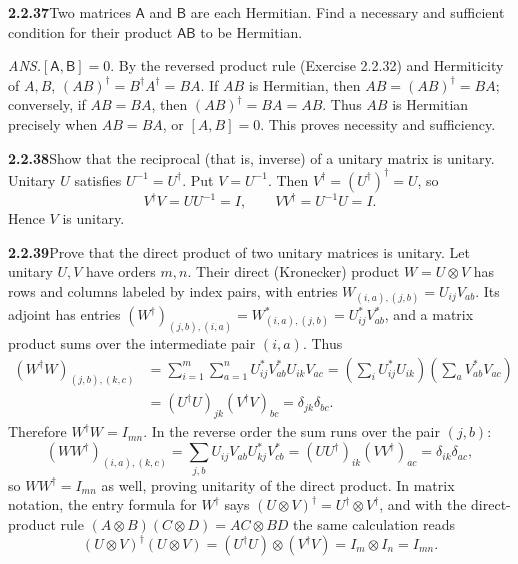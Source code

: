 \par\bigskip
\noindent\textbf{2.2.37}\quad Two matrices $\mathsf{A}$ and $\mathsf{B}$ are
each Hermitian. Find a necessary and sufficient condition for their product
$\mathsf{AB}$ to be Hermitian.
\par\nobreak\hfill\emph{ANS.}\enspace $[\mathsf{A},\mathsf{B}]=0$.
\solution
By the reversed product rule (Exercise 2.2.32) and Hermiticity of
$A,B$, $(AB)^\dagger=B^\dagger A^\dagger=BA$.
If $AB$ is Hermitian, then $AB=(AB)^\dagger=BA$; conversely, if
$AB=BA$, then $(AB)^\dagger=BA=AB$. Thus $AB$ is Hermitian precisely
when $AB=BA$, or $\boxed{[A,B]=0}$. This proves necessity and
sufficiency.

\par\bigskip
\noindent\textbf{2.2.38}\quad Show that the reciprocal (that is, inverse) of a
unitary matrix is unitary.
\solution
Unitary $U$ satisfies $U^{-1}=U^\dagger$. Put $V=U^{-1}$.
Then $V^\dagger=(U^\dagger)^\dagger=U$, so
\[
V^\dagger V=UU^{-1}=I,\qquad VV^\dagger=U^{-1}U=I.
\]
Hence $V$ is unitary.

\par\bigskip
\noindent\textbf{2.2.39}\quad Prove that the direct product of two unitary
matrices is unitary.
\solution
{}
Let unitary $U,V$ have orders $m,n$. Their direct (Kronecker)
product $W=U\otimes V$ has rows and columns labeled by index pairs,
with entries $W_{(i,a),(j,b)}=U_{ij}V_{ab}$. Its adjoint has entries
$(W^\dagger)_{(j,b),(i,a)}=W^*_{(i,a),(j,b)}=U_{ij}^*V_{ab}^*$, and a
matrix product sums over the intermediate pair $(i,a)$. Thus
\[
\begin{aligned}
(W^\dagger W)_{(j,b),(k,c)}
&=\sum_{i=1}^m\sum_{a=1}^n U_{ij}^*V_{ab}^*U_{ik}V_{ac}
=\left(\sum_iU_{ij}^*U_{ik}\right)
\left(\sum_aV_{ab}^*V_{ac}\right)\\
&=(U^\dagger U)_{jk}(V^\dagger V)_{bc}=\delta_{jk}\delta_{bc}.
\end{aligned}
\]
Therefore $W^\dagger W=I_{mn}$. In the reverse order the sum runs
over the pair $(j,b)$:
\[
(WW^\dagger)_{(i,a),(k,c)}
=\sum_{j,b}U_{ij}V_{ab}U_{kj}^*V_{cb}^*
=(UU^\dagger)_{ik}(VV^\dagger)_{ac}=\delta_{ik}\delta_{ac},
\]
so $WW^\dagger=I_{mn}$ as well, proving unitarity of the direct
product. In matrix notation, the entry formula for $W^\dagger$ says
$(U\otimes V)^\dagger=U^\dagger\otimes V^\dagger$, and with the
direct-product rule $(A\otimes B)(C\otimes D)=AC\otimes BD$ the same
calculation reads
\[
(U\otimes V)^\dagger(U\otimes V)
=(U^\dagger U)\otimes(V^\dagger V)=I_m\otimes I_n=I_{mn}.
\]

